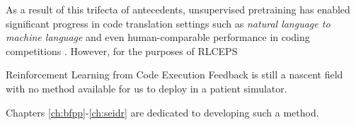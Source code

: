 As a result of this trifecta of antecedents, unsupervised pretraining has enabled significant progress in code translation settings such as \emph{natural language to machine language} \cite{chenEvaluatingLargeLanguage2021, conala, guoContentEnhancedBERTbased2020, hallerPECCProblemExtraction2024, hendrycksMeasuringCodingChallenge2021, honarvarTurbulenceSystematicallyAutomatically2025, huQualityFlowAgenticWorkflow2025, jimenezSWEbenchCanLanguage2024, leiPlanningDrivenProgrammingLarge2025, liEnablingProgrammingThinking2023, liExploringEffectivenessLlms2023, psb2, solimanMarianCGCodeGeneration2022, the-crypt-keeperThecryptkeeperCanaicode2025, zhuoBigCodeBenchBenchmarkingCode2024} and even human-comparable performance in coding competitions \cite{liCompetitionLevelCodeGeneration2022,openaiCompetitiveProgrammingLarge2025}.
However, for the purposes of RLCEPS

\begin{highlight}
    Reinforcement Learning from Code Execution Feedback is still a nascent field with no method available for us to deploy in a patient simulator.
\end{highlight}

Chapters \ref{ch:bfpp}-\ref{ch:seidr} are dedicated to developing such a method.